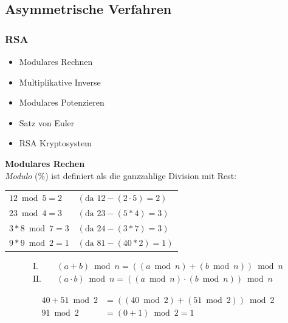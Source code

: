 \documentclass[a4paper,12pt]{article}
\begin{document}
\subsection{Asymmetrische Verfahren}
\subsubsection{RSA}
\begin{itemize}
    \item Modulares Rechnen
    \item Multiplikative Inverse
    \item Modulares Potenzieren
    \item Satz von Euler
    \item RSA Kryptosystem
\end{itemize}

\noindent\textbf{Modulares Rechen}\\
\textit{Modulo} (\%) ist definiert als die ganzzahlige Division mit Rest: 
\begin{table}[H]
    \centering
    \begin{tabular}{l|l}
        $12 \bmod 5 = 2$ & $(\text{da } 12 - (2 \cdot 5) = 2)$ \\
        $23 \bmod 4 = 3$ & $(\text{da } 23 - (5 * 4) = 3)$ \\
        $3 * 8 \bmod 7 = 3$ & $(\text{da } 24 - (3 * 7) = 3)$ \\
        $9 * 9 \bmod 2 = 1$ & $(\text{da } 81 - (40 * 2) = 1)$ \\
    \end{tabular}
\end{table}

\begin{align*}
    \text{I.} \quad &(a + b) \bmod n = ((a \bmod n) + (b \bmod n)) \bmod n \\
    \text{II.} \quad &(a \cdot b) \bmod n = ((a \bmod n) \cdot (b \bmod n)) \bmod n
    \end{align*}

    \begin{align*}
    40 + 51 \bmod 2 &= ((40 \bmod 2) + (51 \bmod 2)) \bmod 2 \\
    91 \bmod 2 &= (0 + 1) \bmod 2 = 1
    \end{align*}
    
\end{document}
